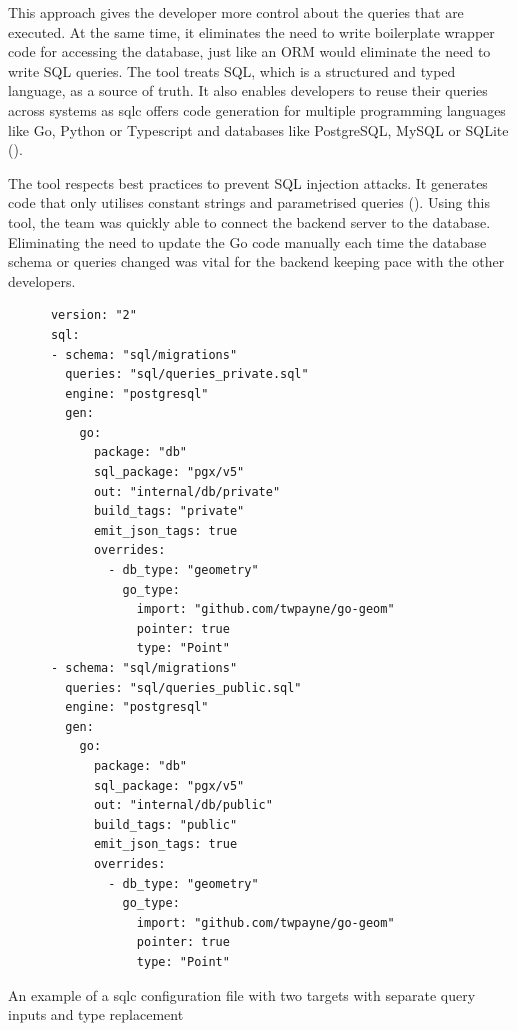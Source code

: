 This approach gives the developer more control about the queries that are
executed. At the same time, it eliminates the need to write boilerplate wrapper
code for accessing the database, just like an ORM would eliminate the need to
write SQL queries. The tool treats SQL, which is a structured and typed
language, as a source of truth. It also enables developers to reuse their
queries across systems as sqlc offers code generation for multiple programming
languages like Go, Python or Typescript and databases like PostgreSQL, MySQL or
SQLite (\cite{sqlc_documentation_language_support}).

The tool respects best practices to prevent SQL injection attacks. It generates
code that only utilises constant strings and parametrised queries
(\cite{sqlc_injection}). Using this tool, the team was quickly able to
connect the backend server to the database. Eliminating the need to update the
Go code manually each time the database schema or queries changed was vital for
the backend keeping pace with the other developers.

\begin{listing}[htbp]
  \centering{}
  \begin{minipage}{0.75\textwidth}
  \begin{verbatim}
      version: "2"
      sql:
      - schema: "sql/migrations"
        queries: "sql/queries_private.sql"
        engine: "postgresql"
        gen:
          go:
            package: "db"
            sql_package: "pgx/v5"
            out: "internal/db/private"
            build_tags: "private"
            emit_json_tags: true
            overrides:
              - db_type: "geometry"
                go_type:
                  import: "github.com/twpayne/go-geom"
                  pointer: true
                  type: "Point"
      - schema: "sql/migrations"
        queries: "sql/queries_public.sql"
        engine: "postgresql"
        gen:
          go:
            package: "db"
            sql_package: "pgx/v5"
            out: "internal/db/public"
            build_tags: "public"
            emit_json_tags: true
            overrides:
              - db_type: "geometry"
                go_type:
                  import: "github.com/twpayne/go-geom"
                  pointer: true
                  type: "Point"
  \end{verbatim}
  \end{minipage}
  \caption{An example of a sqlc configuration file with two targets with separate query inputs and type replacement}
  \label{listing:sqlc_config_file}
\end{listing}

